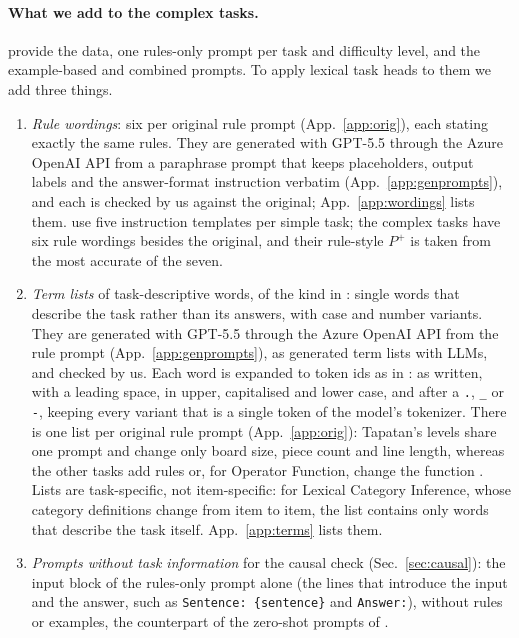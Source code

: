 \documentclass[11pt,a4paper]{article}
\begin{document}
\paragraph{What we add to the complex tasks.}\label{sec:adapt} \citet{fu2026rules} provide the data, one rules-only prompt per task and difficulty level, and the example-based and combined prompts. To apply lexical task heads to them we add three things.
\begin{enumerate}
\item \emph{Rule wordings}: six per original rule prompt (App.~\ref{app:orig}), each stating exactly the same rules. They are generated with GPT-5.5 through the Azure OpenAI API from a paraphrase prompt that keeps placeholders, output labels and the answer-format instruction verbatim (App.~\ref{app:genprompts}), and each is checked by us against the original; App.~\ref{app:wordings} lists them. \citet{yang2026shared} use five instruction templates per simple task; the complex tasks have six rule wordings besides the original, and their rule-style $P^{+}$ is taken from the most accurate of the seven.
\item \emph{Term lists} of task-descriptive words, of the kind in \citet[App.~A.2.1]{yang2026shared}: single words that describe the task rather than its answers, with case and number variants. They are generated with GPT-5.5 through the Azure OpenAI API from the rule prompt (App.~\ref{app:genprompts}), as \citet[App.~O]{yang2026shared} generated term lists with LLMs, and checked by us. Each word is expanded to token ids as in \citet{yang2026shared}: as written, with a leading space, in upper, capitalised and lower case, and after a \texttt{.}, \texttt{\_} or \texttt{-}, keeping every variant that is a single token of the model's tokenizer. There is one list per original rule prompt (App.~\ref{app:orig}): Tapatan's levels share one prompt and change only board size, piece count and line length, whereas the other tasks add rules or, for Operator Function, change the function \citep[Table~1, App.~F]{fu2026rules}. Lists are task-specific, not item-specific: for Lexical Category Inference, whose category definitions change from item to item, the list contains only words that describe the task itself. App.~\ref{app:terms} lists them.
\item \emph{Prompts without task information} for the causal check (Sec.~\ref{sec:causal}): the input block of the rules-only prompt alone (the lines that introduce the input and the answer, such as \texttt{Sentence: \{sentence\}} and \texttt{Answer:}), without rules or examples, the counterpart of the zero-shot prompts of \citet[Sec.~2.3.2]{yang2026shared}.
\end{enumerate}
\end{document}
